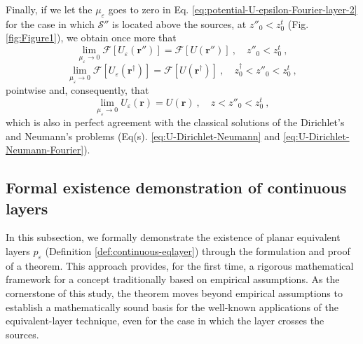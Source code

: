 Finally, if we let the $\mu_{\varepsilon}$ 
goes to zero in Eq. \ref{eq:potential-U-epsilon-Fourier-layer-2} for the case in which 
$\mathcal{S}''$ is located above the sources, at $z''_{0} < z^{t}_{0}$ (Fig. \ref{fig:Figure1}), 
we obtain once more that 
\begin{equation}
	\lim_{\mu_{\varepsilon}\to 0} \mathcal{F} \left[ U_{\varepsilon}(\mathbf{r}'') \right] = 
	\mathcal{F} \left[ U(\mathbf{r}'') \right] \: , \quad z''_{0} < z^{t}_{0} \: ,
	\label{eq:lim-muepsilon-potential-U-epsilon-Fourier-layer}
\end{equation}
\begin{equation}
	\lim_{\mu_{\varepsilon}\to 0} \mathcal{F} \left[ U_{\varepsilon}(\mathbf{r}^{\dagger}) \right] = 
	\mathcal{F} \left[ U(\mathbf{r}^{\dagger}) \right] \: , \quad z^{\dagger}_{0} < z''_{0} < z^{t}_{0} \: ,
	\label{eq:lim-muepsilon-potential-U-epsilon-Fourier-dagger}
\end{equation}
pointwise and, consequently, that
\begin{equation}
	\lim_{\mu_{\varepsilon}\to 0} U_{\varepsilon}(\mathbf{r}) = 
	U(\mathbf{r}) \: , \quad z < z''_{0} < z^{t}_{0} \: ,
	\label{eq:lim-muepsilon-potential-U-epsilon-space}
\end{equation}
which is also in perfect agreement with the classical solutions of the Dirichlet's and Neumann's
problems (Eq(s). \ref{eq:U-Dirichlet-Neumann} and \ref{eq:U-Dirichlet-Neumann-Fourier}).

\subsection{Formal existence demonstration of continuous layers}

In this subsection, we formally demonstrate the existence of planar equivalent layers 
$p_{\varepsilon}$ (Definition \ref{def:continuous-eqlayer}) 
through the formulation and proof of a theorem. This approach provides, for the first time, a rigorous mathematical 
framework for a concept traditionally based on empirical assumptions.
As the cornerstone of this study, the theorem moves beyond empirical assumptions to establish 
a mathematically sound basis for the well-known applications of the equivalent-layer technique, 
even for the case in which the layer crosses the sources.

